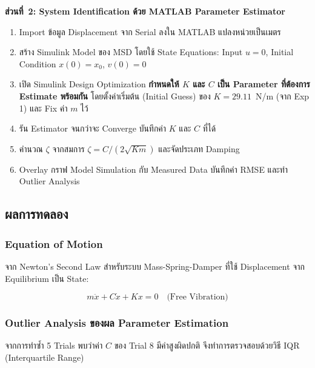 \textbf{ส่วนที่~2: System Identification ด้วย MATLAB Parameter Estimator}

\begin{enumerate}
    \item Import ข้อมูล Displacement จาก Serial ลงใน MATLAB แปลงหน่วยเป็นเมตร
    \item สร้าง Simulink Model ของ MSD โดยใช้ State Equations: Input $u = 0$, Initial Condition $x(0) = x_0$, $v(0) = 0$
    \item เปิด Simulink Design Optimization \textbf{กำหนดให้ $K$ และ $C$ เป็น Parameter ที่ต้องการ Estimate พร้อมกัน} โดยตั้งค่าเริ่มต้น (Initial Guess) ของ $K = 29.11$~N/m (จาก Exp 1) และ Fix ค่า $m$ ไว้
    \item รัน Estimator จนกว่าจะ Converge บันทึกค่า $K$ และ $C$ ที่ได้
    \item คำนวณ $\zeta$ จากสมการ $\zeta = C / (2\sqrt{Km})$ และจัดประเภท Damping
    \item Overlay กราฟ Model Simulation กับ Measured Data บันทึกค่า RMSE และทำ Outlier Analysis
\end{enumerate}

\subsection{ผลการทดลอง}
 
\subsubsection{Equation of Motion}
 
จาก Newton's Second Law สำหรับระบบ Mass-Spring-Damper
ที่ใช้ Displacement จาก Equilibrium เป็น State:
 
\begin{equation}
    m\ddot{x} + C\dot{x} + Kx = 0
    \quad \text{(Free Vibration)}
    \label{eq:eom_free_vib}
\end{equation}
 
\subsubsection{Outlier Analysis ของผล Parameter Estimation}
 
จากการทำซ้ำ 5 Trials พบว่าค่า $C$ ของ Trial 8 มีค่าสูงผิดปกติ
จึงทำการตรวจสอบด้วยวิธี IQR (Interquartile Range)
 
